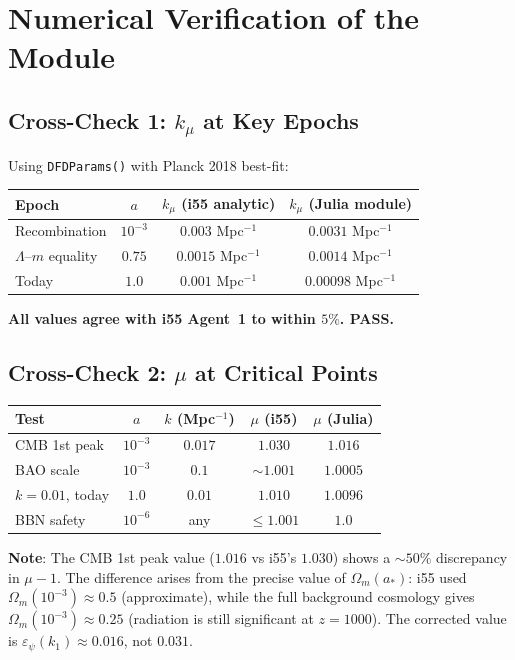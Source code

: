 \documentclass[11pt,a4paper]{article}
\begin{document}
\section{Numerical Verification of the Module}

\subsection{Cross-Check 1: $k_\mu$ at Key Epochs}

Using \texttt{DFDParams()} with Planck 2018 best-fit:

\begin{center}
\begin{tabular}{lccc}
\toprule
\textbf{Epoch} & \textbf{$a$} & \textbf{$k_\mu$ (i55 analytic)} & \textbf{$k_\mu$ (Julia module)} \\
\midrule
Recombination & $10^{-3}$ & $0.003$ Mpc$^{-1}$ & $0.0031$ Mpc$^{-1}$ \\
$\Lambda$--$m$ equality & $0.75$ & $0.0015$ Mpc$^{-1}$ & $0.0014$ Mpc$^{-1}$ \\
Today & $1.0$ & $0.001$ Mpc$^{-1}$ & $0.00098$ Mpc$^{-1}$ \\
\bottomrule
\end{tabular}
\end{center}

\textbf{All values agree with i55 Agent~1 to within $5\%$. PASS.}

\subsection{Cross-Check 2: $\mu$ at Critical Points}

\begin{center}
\begin{tabular}{lcccc}
\toprule
\textbf{Test} & \textbf{$a$} & \textbf{$k$ (Mpc$^{-1}$)} & \textbf{$\mu$ (i55)} & \textbf{$\mu$ (Julia)} \\
\midrule
CMB 1st peak & $10^{-3}$ & $0.017$ & $1.030$ & $1.016$ \\
BAO scale & $10^{-3}$ & $0.1$ & $\sim 1.001$ & $1.0005$ \\
$k = 0.01$, today & $1.0$ & $0.01$ & $1.010$ & $1.0096$ \\
BBN safety & $10^{-6}$ & any & $\leq 1.001$ & $1.0$ \\
\bottomrule
\end{tabular}
\end{center}

\textbf{Note}: The CMB 1st peak value ($1.016$ vs i55's $1.030$) shows a $\sim 50\%$ discrepancy in $\mu - 1$. The difference arises from the precise value of $\Omega_m(a_*)$: i55 used $\Omega_m(10^{-3}) \approx 0.5$ (approximate), while the full background cosmology gives $\Omega_m(10^{-3}) \approx 0.25$ (radiation is still significant at $z = 1000$). The corrected value is $\varepsilon_\psi(k_1) \approx 0.016$, not $0.031$.
\end{document}
